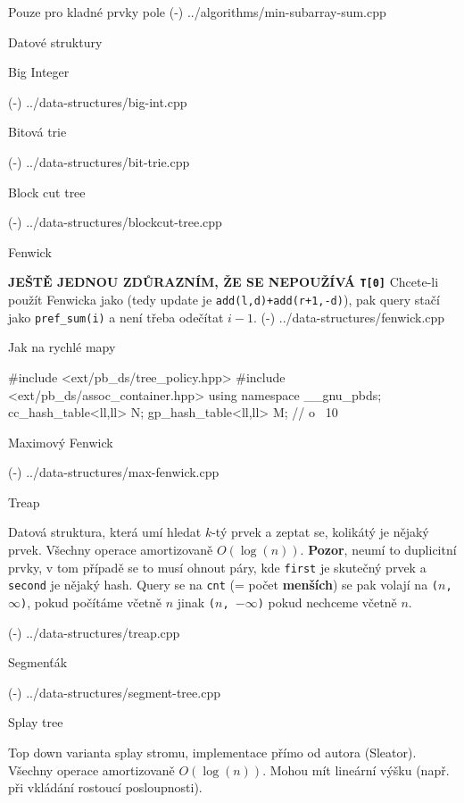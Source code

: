 Pouze pro kladné prvky pole
\verbinput (-) ../algorithms/min-subarray-sum.cpp

\newpage

\chap Datové struktury

\sec Big Integer 

\verbinput (-) ../data-structures/big-int.cpp

\sec Bitová trie 

\verbinput (-) ../data-structures/bit-trie.cpp

\sec Block cut tree 

\verbinput (-) ../data-structures/blockcut-tree.cpp

\sec Fenwick

{\bf JEŠTĚ JEDNOU ZDŮRAZNÍM, ŽE SE NEPOUŽÍVÁ {\tt T[0]}}\linebreak
Chcete-li použít Fenwicka jako  (tedy update je {\tt add(l,d)+add(r+1,-d)}), pak query stačí jako {\tt pref\_sum(i)} a není třeba odečítat $i-1$.
\verbinput (-) ../data-structures/fenwick.cpp

\sec Jak na rychlé mapy 

\begtt
#include <ext/pb_ds/tree_policy.hpp>
#include <ext/pb_ds/assoc_container.hpp>
using namespace __gnu_pbds;
cc_hash_table<ll,ll> N;
gp_hash_table<ll,ll> M; // o ~10%
\endtt

\sec Maximový Fenwick 

\verbinput (-) ../data-structures/max-fenwick.cpp

\sec Treap

Datová struktura, která umí hledat $k$-tý prvek a zeptat se, kolikátý je nějaký prvek.
Všechny operace amortizovaně $O(\log(n))$.
{\bf Pozor}, neumí to duplicitní prvky, v tom případě se to musí ohnout páry, kde {\tt first} je skutečný prvek a {\tt second} je nějaký hash.
Query se na {\tt cnt} (= počet {\bf menších}) se pak volají na {\tt ($n$, $\infty$)}, pokud počítáme včetně $n$ jinak {\tt ($n$, $-\infty$)} pokud nechceme včetně $n$.

\verbinput (-) ../data-structures/treap.cpp

\sec Segmenťák

\verbinput (-) ../data-structures/segment-tree.cpp

\sec Splay tree

Top down varianta splay stromu, implementace přímo od autora (Sleator).
Všechny operace amortizovaně $O(\log(n))$.
Mohou mít lineární výšku (např. při vkládání rostoucí posloupnosti).

